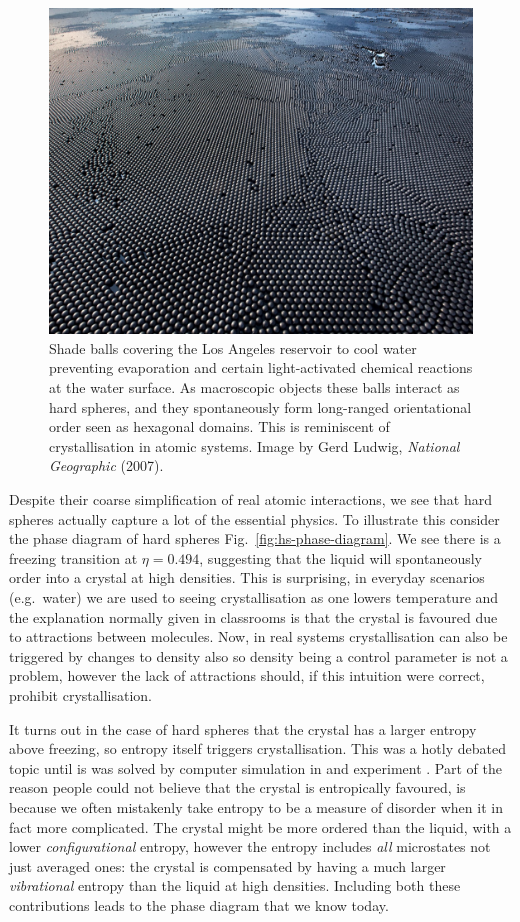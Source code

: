 \documentclass[11pt,twoside]{report}
\begin{document}
\begin{figure}
  \includegraphics[width=0.75\linewidth,outer]{shade-balls}
  \caption[Shade balls floating on water: a 2d `crystal']{
    Shade balls covering the Los Angeles reservoir to cool water preventing evaporation and certain light-activated chemical reactions at the water surface.
    As macroscopic objects these balls interact as hard spheres, and they spontaneously form long-ranged orientational order seen as hexagonal domains.
    This is reminiscent of crystallisation in atomic systems.
    Image by Gerd Ludwig, \emph{National Geographic} (2007).}
  \label{fig:shade-balls}
\end{figure}

Despite their coarse simplification of real atomic interactions, we see that hard spheres actually capture a lot of the essential physics.
To illustrate this consider the phase diagram of hard spheres Fig.\ \ref{fig:hs-phase-diagram}.
We see there is a freezing transition at $\eta = 0.494$, suggesting that the liquid will spontaneously order into a crystal at high densities.
This is surprising, in everyday scenarios (e.g.\ water) we are used to seeing crystallisation as one lowers temperature and the explanation normally given in classrooms is that the crystal is favoured due to attractions between molecules.
Now, in real systems crystallisation can also be triggered by changes to density also so density being a control parameter is not a problem, however the lack of attractions should, if this intuition were correct, prohibit crystallisation.

It turns out in the case of hard spheres that the crystal has a larger entropy above freezing, so entropy itself triggers crystallisation.
This was a hotly debated topic \cite{?,?,?} until is was solved by computer simulation in \cite{?,?,?} and experiment \cite{?,?,?}.
Part of the reason people could not believe that the crystal is entropically favoured, is because we often mistakenly take entropy to be a measure of disorder when it in fact more complicated.
The crystal might be more ordered than the liquid, with a lower \emph{configurational} entropy, however the entropy includes \emph{all} microstates not just averaged ones: the crystal is compensated by having a much larger \emph{vibrational} entropy than the liquid at high densities.
Including both these contributions leads to the phase diagram that we know today.
\end{document}

